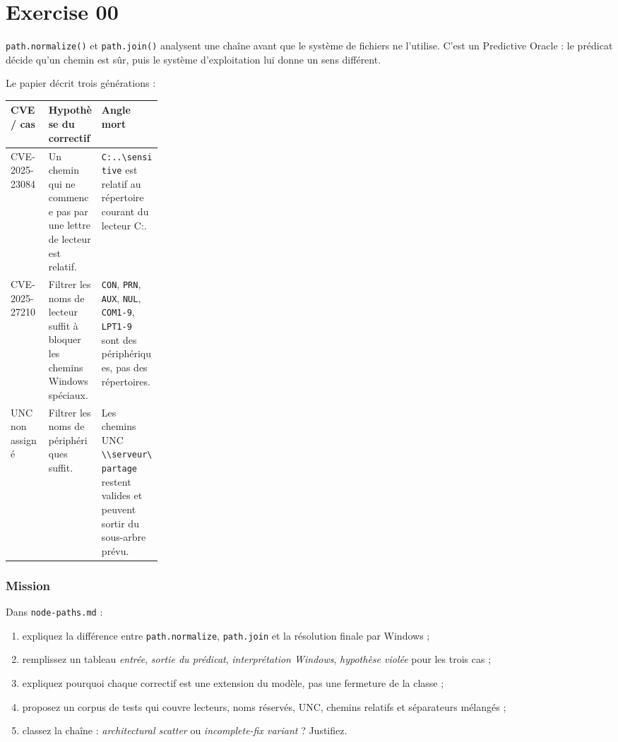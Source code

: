 \documentclass{training}
\begin{document}
\startexercices

\chapter{Exercise 00}
\makeheaderfiles

\texttt{path.normalize()} et \texttt{path.join()} analysent une chaîne avant
que le système de fichiers ne l'utilise. C'est un Predictive Oracle : le
prédicat décide qu'un chemin est sûr, puis le système d'exploitation lui
donne un sens différent.

Le papier décrit trois générations :

\begin{center}
\begin{tabularx}{\linewidth}{|p{0.25\linewidth}|X|X|}
\hline
\textbf{CVE / cas} & \textbf{Hypothèse du correctif} & \textbf{Angle mort} \\ \hline
CVE-2025-23084 & Un chemin qui ne commence pas par une lettre de lecteur
est relatif. & \texttt{C:..\textbackslash{}sensitive} est relatif au
répertoire courant du lecteur C:. \\ \hline
CVE-2025-27210 & Filtrer les noms de lecteur suffit à bloquer les chemins
Windows spéciaux. & \texttt{CON}, \texttt{PRN}, \texttt{AUX}, \texttt{NUL},
\texttt{COM1-9}, \texttt{LPT1-9} sont des périphériques, pas des
répertoires. \\ \hline
UNC non assigné & Filtrer les noms de périphériques suffit. & Les chemins
UNC \texttt{\textbackslash\textbackslash{}serveur\textbackslash{}partage}
restent valides et peuvent sortir du sous-arbre prévu. \\ \hline
\end{tabularx}
\end{center}

\subsection*{Mission}

Dans \texttt{node-paths.md} :

\begin{enumerate}
  \item expliquez la différence entre \texttt{path.normalize},
        \texttt{path.join} et la résolution finale par Windows ;
  \item remplissez un tableau \emph{entrée}, \emph{sortie du prédicat},
        \emph{interprétation Windows}, \emph{hypothèse violée} pour les
        trois cas ;
  \item expliquez pourquoi chaque correctif est une extension du modèle, pas
        une fermeture de la classe ;
  \item proposez un corpus de tests qui couvre lecteurs, noms réservés,
        UNC, chemins relatifs et séparateurs mélangés ;
  \item classez la chaîne : \emph{architectural scatter} ou
        \emph{incomplete-fix variant} ? Justifiez.
\end{enumerate}
\end{document}
